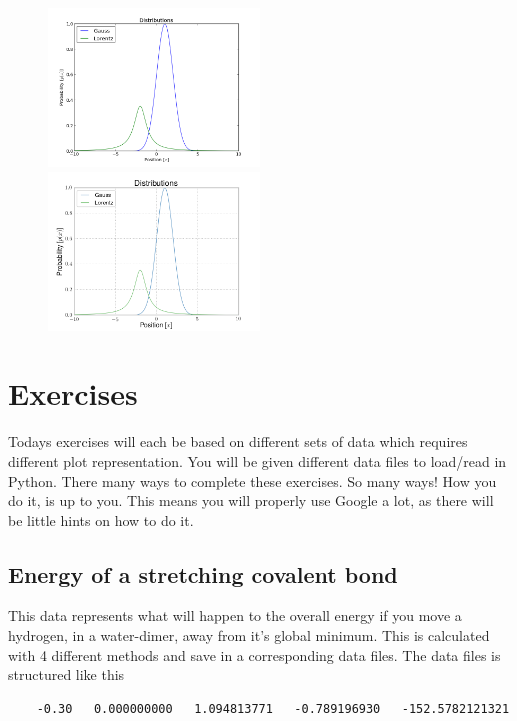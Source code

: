 \documentclass{article}
\begin{document}
\begin{figure}[htb]
  \includegraphics[width=0.5\textwidth]{figure_xy_before.png}
  \includegraphics[width=0.5\textwidth]{figure_xy_after.png}
\end{figure}




\section{Exercises}

Todays exercises will each be based on different sets of data which requires different plot representation.
You will be given different data files to load/read in Python.
There many ways to complete these exercises. So many ways!
How you do it, is up to you.
This means you will properly use Google a lot, as there will be little hints on how to do it.


\newpage
\subsection{Energy of a stretching covalent bond}

This data represents what will happen to the overall energy if you move a hydrogen, in a water-dimer, away from it's global minimum.
This is calculated with 4 different methods and save in a corresponding data files.
The data files  is structured like this

\begin{lstlisting}
    -0.30   0.000000000   1.094813771   -0.789196930   -152.5782121321
\end{lstlisting}
\end{document}
